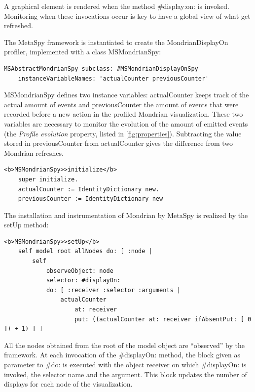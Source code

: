 \documentclass[runningheads]{llncs}
\newcommand{\project}{{\sc MetaSpy}\xspace}
\newcommand{\co}[1]{{\sf #1}}
\begin{document}
A graphical element is rendered when the method \co{\#display:on:} is invoked. Monitoring when these invocations occur is key to have a global view of what get refreshed. 

The \project framework is instantiated to create the {\sc MondrianDisplayOn} profiler, implemented with a class \co{\sf MSMondrianSpy}:

\begin{lstlisting}
MSAbstractMondrianSpy subclass: #MSMondrianDisplayOnSpy
    instanceVariableNames: 'actualCounter previousCounter'
\end{lstlisting}

{\sf MSMondrianSpy} defines two instance variables: {\sf actualCounter} keeps track of the actual amount of events and {\sf previousCounter} the amount of events that were recorded before a new action in the profiled Mondrian visualization. These two variables are necessary to monitor the evolution of the amount of emitted events (the \emph{Profile evolution} property, listed in \autoref{fig:properties}). Subtracting the value stored in {\sf previousCounter} from {\sf actualCounter} gives the difference from two Mondrian refreshes.

\begin{lstlisting}
<b>MSMondrianSpy>>initialize</b>
    super initialize.
    actualCounter := IdentityDictionary new.
    previousCounter := IdentityDictionary new
\end{lstlisting}

The installation and instrumentation of Mondrian by \project is realized by the {\sf setUp} method:

\begin{lstlisting}
<b>MSMondrianSpy>>setUp</b>
    self model root allNodes do: [ :node |
        self 
            observeObject: node
            selector: #displayOn:
            do: [ :receiver :selector :arguments |
                actualCounter 
                    at: receiver
                    put: ((actualCounter at: receiver ifAbsentPut: [ 0 ]) + 1) ] ]
\end{lstlisting}

All the nodes obtained from the root of the model object are ``observed'' by the framework. At each invocation of the {\sf \#displayOn:} method, the block given as parameter to {\sf \#do:} is executed with the object receiver on which {\sf \#displayOn:} is invoked, the selector name and the argument. This block updates the number of displays for each node of the visualization.
\end{document}
